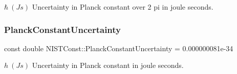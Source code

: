 $\hbar \ (J s)$ Uncertainty in Planck constant over 2 pi in joule seconds. \mbox{\label{group___planck_constant_gaf490152b8477c6ead134e42e76753f64}} 
\subsubsection{\texorpdfstring{Planck\+Constant\+Uncertainty}{PlanckConstantUncertainty}}
{\footnotesize\ttfamily const double N\+I\+S\+T\+Const\+::\+Planck\+Constant\+Uncertainty = 0.\+000000081e-\/34}

$h \ (J s)$ Uncertainty in Planck constant in joule seconds. 